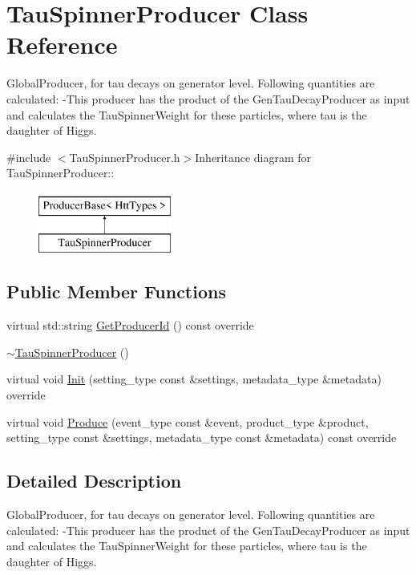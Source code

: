 \hypertarget{classTauSpinnerProducer}{
\section{TauSpinnerProducer Class Reference}
\label{classTauSpinnerProducer}
}


GlobalProducer, for tau decays on generator level. Following quantities are calculated: -\/This producer has the product of the GenTauDecayProducer as input and calculates the TauSpinnerWeight for these particles, where tau is the daughter of Higgs.  


{\ttfamily \#include $<$TauSpinnerProducer.h$>$}Inheritance diagram for TauSpinnerProducer::\begin{figure}[H]
\begin{center}
\leavevmode
\includegraphics[height=2cm]{classTauSpinnerProducer}
\end{center}
\end{figure}
\subsection*{Public Member Functions}
\begin{DoxyCompactItemize}
\item 
virtual std::string \hyperlink{classTauSpinnerProducer_a712031787a9a2142ab2469080358dc45}{GetProducerId} () const override
\item 
\hyperlink{classTauSpinnerProducer_a344c89bc8805deba03c0a6a2ba46d076}{$\sim$TauSpinnerProducer} ()
\item 
virtual void \hyperlink{classTauSpinnerProducer_a9a7f5c13182618efc948cfdb44435d51}{Init} (setting\_\-type const \&settings, metadata\_\-type \&metadata) override
\item 
virtual void \hyperlink{classTauSpinnerProducer_acb56109bf7e4400eb1f98b614f5e297a}{Produce} (event\_\-type const \&event, product\_\-type \&product, setting\_\-type const \&settings, metadata\_\-type const \&metadata) const override
\end{DoxyCompactItemize}


\subsection{Detailed Description}
GlobalProducer, for tau decays on generator level. Following quantities are calculated: -\/This producer has the product of the GenTauDecayProducer as input and calculates the TauSpinnerWeight for these particles, where tau is the daughter of Higgs. 

